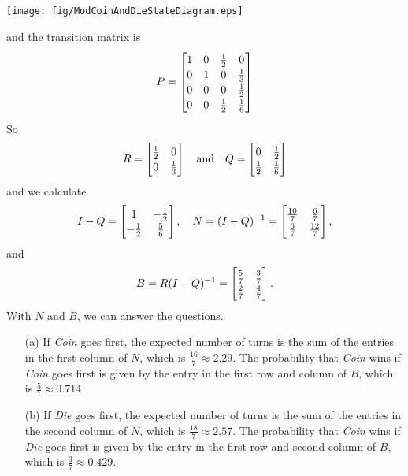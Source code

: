 \documentclass[reqno]{immbook}
\newcommand{\T}{\rule{0pt}{2.6ex}}
\newcommand{\B}{\rule[-1.2ex]{0pt}{0pt}}
\numberwithin{equation}{chapter}
\numberwithin{question}{section}
\numberwithin{theorem}{chapter}
\numberwithin{figure}{chapter}
\theoremstyle{definition}
\begin{document}
\medskip
\centerline{%
\texttt{[image: fig/ModCoinAndDieStateDiagram.eps]}
}
and the transition matrix is
\[
P = \begin{bmatrix}
        1  &  0  & \frac{1}{2} & 0 \T \B \\
	0  &  1  &   0         & \frac{1}{3} \B \\
	0  &  0  &   0         & \frac{1}{2} \B \\
	0  &  0  & \frac{1}{2} & \frac{1}{6} \B \\
    \end{bmatrix}
\]
So
\[
  R = \begin{bmatrix}
          \frac{1}{2} & 0 \T\B \\
	      0       & \frac{1}{3} \B 
      \end{bmatrix}
  \quad \textrm{and}\quad
  Q = \begin{bmatrix}
          0 & \frac{1}{2} \T\B \\
	  \frac{1}{2}    & \frac{1}{6} \B 
      \end{bmatrix}
\]
and we calculate
\[
I-Q = \begin{bmatrix}
          1 & -\frac{1}{2} \T\B \\
	  -\frac{1}{2}    & \frac{5}{6} \B 
      \end{bmatrix},
 \quad
N = (I-Q)^{-1} =
      \begin{bmatrix}
          \frac{10}{7} & \frac{6}{7} \T\B \\
	  \frac{6}{7}  & \frac{12}{7} \B 
      \end{bmatrix},
\]
and
\[
B = R(I-Q)^{-1} =
      \begin{bmatrix}
          \frac{5}{7} & \frac{3}{7} \T\B \\
	  \frac{2}{7}  & \frac{4}{7} \B 
      \end{bmatrix}.
\]
With $N$ and $B$, we can answer the questions.
\begin{enumerate}
\item[(a)] If \emph{Coin} goes first, the expected number
of turns is the sum of the entries in the first column
of $N$, which is $\frac{16}{7} \approx 2.29$.
The probability that \emph{Coin} wins if \emph{Coin}
goes first is given by the entry in the first
row and column of $B$, which is
$\frac{5}{7} \approx 0.714$.
\item[(b)] If \emph{Die} goes first, the expected number
of turns is the sum of the entries in the second column
of $N$, which is $\frac{18}{7} \approx 2.57$.
The probability that \emph{Coin} wins if \emph{Die}
goes first is given by the entry in the first
row and second column of $B$, which is
$\frac{3}{7} \approx 0.429$.
\end{enumerate}
\end{document}
